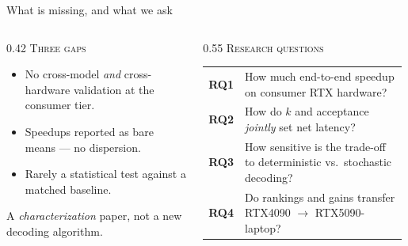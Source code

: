 \documentclass[aspectratio=169, 11pt]{beamer}
\begin{document}
\begin{frame}{What is missing, and what we ask}
  \begin{columns}[T,onlytextwidth]
    \begin{column}{0.42\textwidth}
      {\footnotesize\color{ink2}\textsc{Three gaps}}\par
      \vskip6pt
      \begin{itemize}\itemsep5pt
        \item No cross-model \emph{and} cross-hardware validation at the
              consumer tier.
        \item Speedups reported as bare means --- no dispersion.
        \item Rarely a statistical test against a matched baseline.
      \end{itemize}
      \vskip8pt
      {\small\color{ink2}A \emph{characterization} paper, not a new decoding
      algorithm.}
    \end{column}
    \begin{column}{0.55\textwidth}
      {\footnotesize\color{ink2}\textsc{Research questions}}\par
      \vskip6pt
      {\small
      \begin{tabular}{@{}p{0.09\linewidth}@{}>{\raggedright\arraybackslash}p{0.89\linewidth}@{}}
        \textcolor{accent}{\textbf{RQ1}} & How much end-to-end speedup on consumer RTX hardware?\\[4pt]
        \textcolor{accent}{\textbf{RQ2}} & How do $k$ and acceptance \emph{jointly} set net latency?\\[4pt]
        \textcolor{accent}{\textbf{RQ3}} & How sensitive is the trade-off to deterministic vs.\ stochastic decoding?\\[4pt]
        \textcolor{accent}{\textbf{RQ4}} & Do rankings and gains transfer RTX4090 $\to$ RTX5090-laptop?\\
      \end{tabular}}
    \end{column}
  \end{columns}
\end{frame}
\end{document}
